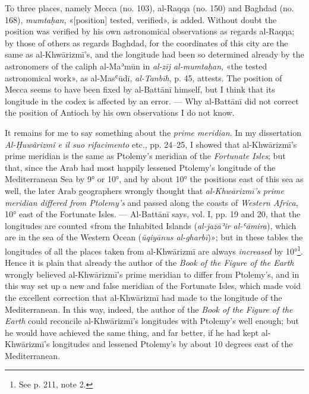 \documentclass[11pt]{article}
\begin{document}
\par To three places, namely Mecca (no. 103), al-Raqqa (no. 150) and Baghdad (no. 168), \emph{mumtaḥan}, «[position] tested, verified», is added. Without doubt the position was verified by his own astronomical observations as regards al-Raqqa; by those of others as regards Baghdad, for the coordinates of this city are the same as al-Khwārizmī's, and the longitude had been so determined already by the astronomers of the caliph al-Maʾmūn in \emph{al-zīj al-mumtaḥan}, «the tested astronomical work», as al-Masʿūdī, \emph{al-Tanbīh}, p. 45, attests. The position of Mecca seems to have been fixed by al-Battānī himself, but I think that its longitude in the codex is affected by an error. — Why al-Battānī did not correct the position of Antioch by his own observations I do not know.\par
\par It remains for me to say something about the \emph{prime meridian}. In my dissertation \emph{Al-Ḫuwârizmî e il suo rifacimento} etc., pp. 24–25, I showed that al-Khwārizmī's prime meridian is the same as Ptolemy's meridian of the \emph{Fortunate Isles}; but that, since the Arab had most happily lessened Ptolemy's longitude of the Mediterranean Sea by 9° or 10°, and by about 10° the positions east of this sea as well, the later Arab geographers wrongly thought that \emph{al-Khwārizmī's prime meridian differed from Ptolemy's} and passed along the coasts of \emph{Western Africa}, 10° east of the Fortunate Isles. — Al-Battānī says, vol. I, pp. 19 and 20, that the longitudes are counted «from the Inhabited Islands (\emph{al-jazāʾir al-ʿāmira}), which are in the sea of the Western Ocean (\emph{ūqiyānus al-gharbī})»; but in these tables the longitudes of all the places taken from al-Khwārizmī are always \emph{increased} by 10°\footnote{See p. 211, note 2.}. Hence it is plain that already the author of the \emph{Book of the Figure of the Earth} wrongly believed al-Khwārizmī's prime meridian to differ from Ptolemy's, and in this way set up a new and false meridian of the Fortunate Isles, which made void the excellent correction that al-Khwārizmī had made to the longitude of the Mediterranean. In this way, indeed, the author of the \emph{Book of the Figure of the Earth} could reconcile al-Khwārizmī's longitudes with Ptolemy's well enough; but he would have achieved the same thing, and far better, if he had kept al-Khwārizmī's longitudes and lessened Ptolemy's by about 10 degrees east of the Mediterranean.\par
\end{document}
